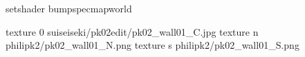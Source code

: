 setshader bumpspecmapworld

texture 0 suiseiseki/pk02edit/pk02_wall01_C.jpg
texture n philipk2/pk02_wall01_N.png
texture s philipk2/pk02_wall01_S.png

